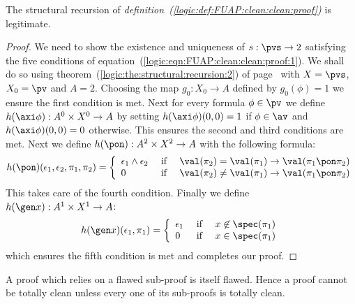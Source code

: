 \begin{prop}
The structural recursion of {\em
definition~(\ref{logic:def:FUAP:clean:clean:proof})} is legitimate.
\end{prop}
\begin{proof}
We need to show the existence and uniqueness of $s:\pvs\to 2$
satisfying the five conditions of
equation~(\ref{logic:eqn:FUAP:clean:clean:proof:1}). We shall do so
using theorem~(\ref{logic:the:structural:recursion:2}) of
page~\pageref{logic:the:structural:recursion:2} with $X=\pvs$,
$X_{0}=\pv$ and $A=2$. Choosing the map $g_{0}:X_{0}\to A$ defined
by $g_{0}(\phi)=1$ we ensure the first condition is met. Next for
every formula $\phi\in\pv$ we define $h(\axi\phi):A^{0}\times
X^{0}\to A$ by setting $h(\axi\phi)(0,0)=1$ if $\phi\in\av$ and
$h(\axi\phi)(0,0)=0$ otherwise. This ensures the second and third
conditions are met. Next we define $h(\pon):A^{2}\times X^{2}\to A$
with the following formula:
    \[
        h(\pon)(\epsilon_{1},\epsilon_{2},\pi_{1},\pi_{2})=\left\{
        \begin{array}{lcl}
        \epsilon_{1}\land\epsilon_{2}&\mbox{\ if\ }&
        \val(\pi_{2})=\val(\pi_{1})\to\val(\pi_{1}\pon\pi_{2})\\
        0&\mbox{\ if\ }&\val(\pi_{2})\neq\val(\pi_{1})\to\val(\pi_{1}\pon\pi_{2})\\
        \end{array}
    \right.
    \]
This takes care of the fourth condition. Finally we define $h(\gen
x):A^{1}\times X^{1}\to A$:
        \[
        h(\gen x)(\epsilon_{1},\pi_{1})=\left\{
        \begin{array}{lcl}
        \epsilon_{1}&\mbox{\ if\ }&
        x\not\in\spec(\pi_{1})\\
        0&\mbox{\ if\ }&x\in\spec(\pi_{1})\\
        \end{array}
    \right.
    \]
which ensures the fifth condition is met and completes our proof.
\end{proof}

A proof which relies on a flawed sub-proof is itself flawed. Hence a
proof cannot be totally clean unless every one of its sub-proofs is
totally clean.

